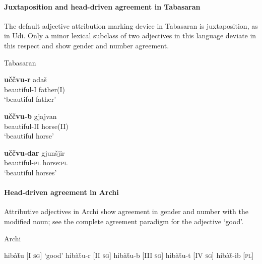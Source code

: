 \paragraph{Juxtaposition and head-driven agreement in Tabasaran}
The default adjective attribution marking device in Tabasaran is juxtaposition, as in Udi. Only a minor lexical subclass of two adjectives in this language deviate in this respect and show gender and number agreement.
\begin{exe}
\ex 
\rm{Tabasaran \citep[50–51]{kurbanov1986}}
\begin{xlist}
\ex 
\gll 	\textbf{uččvu-r} adaš\\
	beautiful-\textsc{I} father\textsc{(I)}\\
\glt	‘beautiful father’

\ex 
\gll	\textbf{uččvu-b} gjajvan\\
	beautiful-\textsc{II} horse\textsc{(II)}\\
\glt	‘beautiful horse’

\ex
\gll	\textbf{uččvu-dar} gjunšjir\\
	beautiful-\textsc{pl} horse:\textsc{pl}\\
\glt	‘beautiful horses’
\end{xlist}
\end{exe}

\paragraph{Head-driven agreement in Archi}
Attributive adjectives in Archi show agreement in gender and number with the modified noun; see the complete agreement paradigm for the adjective ‘good’.
\begin{exe}
\ex 
\rm{Archi \citep{kibrik1994a}}
\begin{xlist}
\ex	hibàt̄u	\rm{[\textsc{I sg}] ‘good’}
\ex	hibàt̄u-r	\rm{[\textsc{II sg}]}
\ex	hibàt̄u-b	\rm{[\textsc{III sg}]}
\ex	hibàt̄u-t	\rm{[\textsc{IV sg}]}
\ex	hibàt̄-ib	\rm{[\textsc{pl}]}
\end{xlist}
\end{exe}

